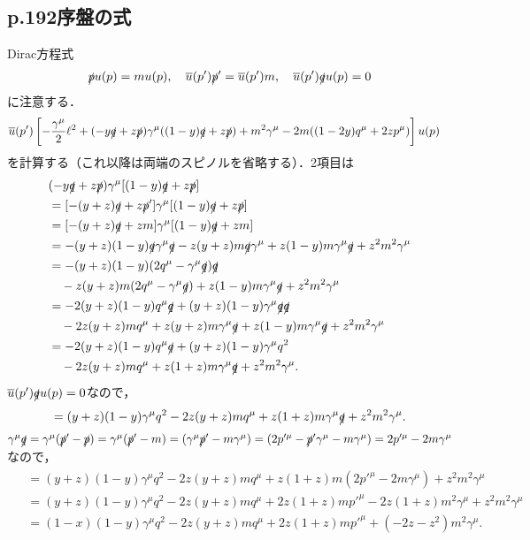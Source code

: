 \subsection{p.192序盤の式}
Dirac方程式
\begin{align}
  \slashed{p} u(p) = m u(p) , \quad \overline{u}(p') \slashed{p}' = \overline{u}(p') m , \quad \overline{u}(p') \slashed{q} u(p) = 0
  \label{p_192_Dirac_eq}
\end{align}
に注意する．
\begin{align*}
  & \overline{u}(p') \left[ -\frac{\gamma^\mu}{2} \ell^2 + (-y\slashed{q}+z\slashed{p}) \gamma^\mu ((1-y)\slashed{q}+z\slashed{p})
  + m^2\gamma^\mu - 2m ((1-2y)q^\mu + 2zp^\mu) \right] u(p)
\end{align*}
を計算する（これ以降は両端のスピノルを省略する）．2項目は
\begin{align*}
  &  (-y\slashed{q}+z\slashed{p}) \gamma^\mu [(1-y)\slashed{q} + z\slashed{p}]  \\
  & = [- (y+z)\slashed{q} + z\slashed{p}' ] \gamma^\mu [(1-y)\slashed{q} + z\slashed{p}] \\
  & = [- (y+z)\slashed{q} + zm] \gamma^\mu [(1-y)\slashed{q} + zm] \\
  &= -(y+z)(1-y)\slashed{q}\gamma^\mu\slashed{q} - z(y+z)m \slashed{q}\gamma^\mu + z(1-y)m \gamma^\mu\slashed{q} + z^2m^2 \gamma^\mu \\
  &= -(y+z)(1-y)(2q^\mu - \gamma^\mu\slashed{q})\slashed{q} \\
  &\quad - z(y+z)m (2q^\mu - \gamma^\mu\slashed{q}) + z(1-y)m \gamma^\mu\slashed{q} + z^2m^2 \gamma^\mu \\
  &= -2(y+z)(1-y)q^\mu\slashed{q} + (y+z)(1-y) \gamma^\mu\slashed{q}\slashed{q} \\
  &\quad - 2z(y+z)m q^\mu + z(y+z)m \gamma^\mu\slashed{q} + z(1-y)m \gamma^\mu\slashed{q} + z^2m^2 \gamma^\mu \\
  &= -2(y+z)(1-y)q^\mu\slashed{q} + (y+z)(1-y) \gamma^\mu q^2 \\
  &\quad - 2z(y+z)m q^\mu + z(1+z)m \gamma^\mu\slashed{q} + z^2m^2 \gamma^\mu .
\end{align*}
$\overline{u}(p') \slashed{q} u(p) = 0$なので，
\[ = (y+z)(1-y) \gamma^\mu q^2 - 2z(y+z)m q^\mu + z(1+z)m \gamma^\mu\slashed{q} + z^2m^2 \gamma^\mu . \]
$\gamma^\mu\slashed{q} = \gamma^\mu (\slashed{p}' - \slashed{p}) = \gamma^\mu (\slashed{p}' - m) = (\gamma^\mu\slashed{p}' - m\gamma^\mu) = (2p'^\mu - \slashed{p}'\gamma^\mu - m\gamma^\mu) = 2p'^\mu - 2m\gamma^\mu$なので，
\begin{align}
  \begin{split}
    &= (y+z)(1-y) \gamma^\mu q^2 - 2z(y+z)m q^\mu + z(1+z)m (2p'^\mu - 2m\gamma^\mu) + z^2m^2 \gamma^\mu \\
    &= (y+z)(1-y) \gamma^\mu q^2 - 2z(y+z)m q^\mu + 2z(1+z)mp'^\mu -2 z(1+z)m^2 \gamma^\mu + z^2m^2 \gamma^\mu \\
    &= (1-x)(1-y) \gamma^\mu q^2 - 2z(y+z)m q^\mu + 2z(1+z)mp'^\mu + (-2z - z^2) m^2 \gamma^\mu .
  \end{split}
  \label{eq_p_192_term2}
\end{align}
